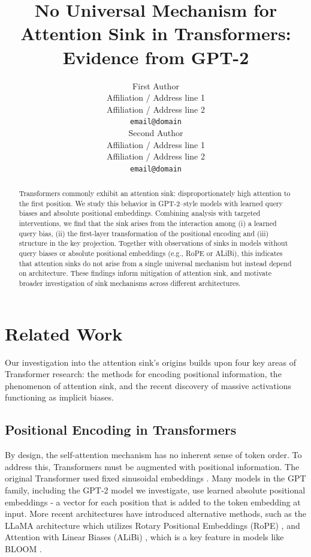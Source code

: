 \documentclass[11pt]{article}
\title{No Universal Mechanism for Attention Sink in Transformers: \\Evidence from GPT-2}
\author{First Author \\
  Affiliation / Address line 1 \\
  Affiliation / Address line 2 \\
  \texttt{email@domain} \\\And
  Second Author \\
  Affiliation / Address line 1 \\
  Affiliation / Address line 2 \\
  \texttt{email@domain} \\
}
\date{}
\newif\ifYRMcomments
\newcommand{\YTODO}[1]{\ifYRMcomments\textcolor{pink}{[TODO for Yuval: #1]}\fi}
\newcommand{\YRM}[1]{\ifYRMcomments\textcolor{red}{[YRM: #1]}\fi}
\begin{document}
\maketitle

\begin{abstract}
  Transformers commonly exhibit an attention sink: disproportionately high attention to the first position. We study this behavior in GPT-2–style models with learned query biases and absolute positional embeddings. Combining analysis with targeted interventions, we find that the sink arises from the interaction among (i) a learned query bias, (ii) the first-layer transformation of the positional encoding and (iii) structure in the key projection. Together with observations of sinks in models without query biases or absolute positional embeddings (e.g., RoPE or ALiBi), this indicates that attention sinks do not arise from a single universal mechanism but instead depend on architecture. These findings inform mitigation of attention sink, and motivate broader investigation of sink mechanisms across different architectures.
\end{abstract}

\YTODO{Write an intro.}

\section{Related Work}
\YRM{I didn't look at this part yet, waiting for you to finish it fist :) } 

\YRM{As mentioned, this needs to be improved - By citing more, making this more concise (as concise as possible while including really vital info, and adding more in appendix if needed, like we did in our attention knockout paper )}Our investigation into the attention sink's origins builds upon four key areas of Transformer research: the methods for encoding positional information, the phenomenon of attention sink, and the recent discovery of massive activations functioning as implicit biases.

\subsection{Positional Encoding in Transformers}
By design, the self-attention mechanism has no inherent sense of token order. To address this, Transformers must be augmented with positional information. The original Transformer used fixed sinusoidal embeddings \citep{vaswani2017attention}. Many models in the GPT family, including the GPT-2 model we investigate, use learned absolute positional embeddings - a vector for each position that is added to the token embedding at input. More recent architectures have introduced alternative methods, such as the LLaMA architecture \citep{touvron2023llama2} which utilizes Rotary Positional Embeddings (RoPE) \citep{su2021roformer}, and Attention with Linear Biases (ALiBi) \citep{press2021train}, which is a key feature in models like BLOOM \citep{bigscience2023bloom}.
\end{document}

